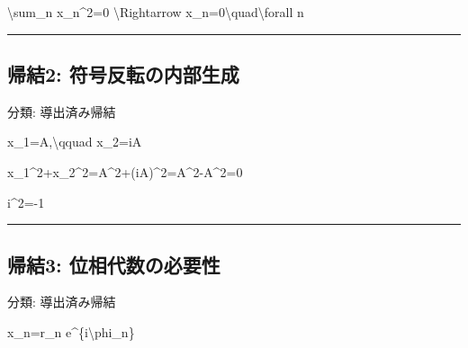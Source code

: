 \documentclass[
  a4paper]{ltjsarticle}
\newenvironment{Shaded}{}{}
\newcommand{\NormalTok}[1]{#1}
\begin{document}
\begin{Shaded}
\begin{Highlighting}[]
\NormalTok{\textbackslash{}sum\_n x\_n\^{}2=0}
\NormalTok{\textbackslash{}Rightarrow}
\NormalTok{x\_n=0\textbackslash{}quad\textbackslash{}forall n}
\end{Highlighting}
\end{Shaded}

\begin{center}\rule{0.5\linewidth}{0.5pt}\end{center}

\subsection{帰結2:
符号反転の内部生成}\label{ux5e30ux7d502-ux7b26ux53f7ux53cdux8ee2ux306eux5185ux90e8ux751fux6210}

分類: 導出済み帰結

\begin{Shaded}
\begin{Highlighting}[]
\NormalTok{x\_1=A,\textbackslash{}qquad x\_2=iA}
\end{Highlighting}
\end{Shaded}

\begin{Shaded}
\begin{Highlighting}[]
\NormalTok{x\_1\^{}2+x\_2\^{}2=A\^{}2+(iA)\^{}2=A\^{}2{-}A\^{}2=0}
\end{Highlighting}
\end{Shaded}

\begin{Shaded}
\begin{Highlighting}[]
\NormalTok{i\^{}2={-}1}
\end{Highlighting}
\end{Shaded}

\begin{center}\rule{0.5\linewidth}{0.5pt}\end{center}

\subsection{帰結3:
位相代数の必要性}\label{ux5e30ux7d503-ux4f4dux76f8ux4ee3ux6570ux306eux5fc5ux8981ux6027}

分類: 導出済み帰結

\begin{Shaded}
\begin{Highlighting}[]
\NormalTok{x\_n=r\_n e\^{}\{i\textbackslash{}phi\_n\}}
\end{Highlighting}
\end{Shaded}
\end{document}
